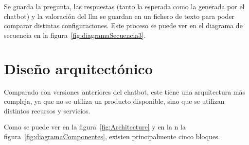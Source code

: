 Se guarda la pregunta, las respuestas (tanto la esperada como la generada por el chatbot) y la valoración del \acrshort{llm} se guardan en un fichero de texto para poder comparar distintas configuraciones. Este proceso se puede ver en el diagrama de secuencia en la figura~\ref{fig:diagramaSecuencia3}.


\newpage
\section{Diseño arquitectónico}

Comparado con versiones anteriores del chatbot, este tiene una arquitectura más compleja, ya que no se utiliza un producto disponible, sino que se utilizan distintos recursos y servicios.


Como se puede ver en la figura~\ref{fig:Architecture} y en la n la figura~\ref{fig:diagramaComponentes}, existen principalmente cinco bloques.

